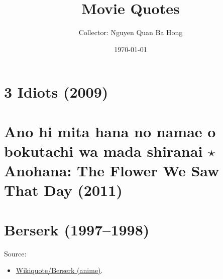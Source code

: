 \documentclass{book}
\title{Movie Quotes}
\author{Collector: Nguyen Quan Ba Hong}
\date{\today}
\numberwithin{equation}{section}
\begin{document}
\maketitle
\setcounter{secnumdepth}{6}
\setcounter{tocdepth}{6}
\tableofcontents


\chapter{3 Idiots (2009)}


\chapter{Ano hi mita hana no namae o bokutachi wa mada shiranai $\star$ Anohana: The Flower We Saw That Day (2011)}


\chapter{Berserk (1997--1998)}

Source:
\begin{itemize}
    \item \href{https://en.wikiquote.org/wiki/Berserk_(anime)}{Wikiquote/Berserk (anime)}.
\end{itemize}
\end{document}
